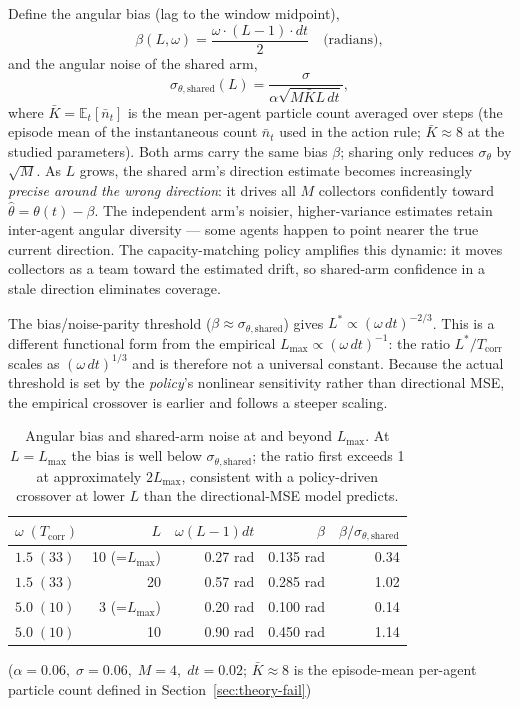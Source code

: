 \documentclass[sigconf,anonymous]{aamas}
\newcommand{\Lmax}{L_{\max}}
\newcommand{\Tcorr}{T_{\mathrm{corr}}}
\newcommand{\angbias}{\beta}
\begin{document}
Define the angular bias (lag to the window midpoint),
\[
  \angbias(L,\omega) = \frac{\omega \cdot (L-1) \cdot dt}{2}
    \quad \text{(radians)},
\]
and the angular noise of the shared arm,
\[
  \sigma_{\theta,\mathrm{shared}}(L) =
  \frac{\sigma}{\alpha\sqrt{M\bar{K} L\, dt}},
\]
where $\bar{K} = \mathbb{E}_t[\bar{n}_t]$ is the mean per-agent particle
count averaged over steps (the episode mean of the instantaneous
count $\bar{n}_t$ used in the action rule; $\bar{K}{\approx}8$ at
the studied parameters).
Both arms carry the same bias $\angbias$; sharing only reduces
$\sigma_\theta$ by $\sqrt{M}$.  As $L$ grows, the shared arm's
direction estimate becomes increasingly \emph{precise around the
wrong direction}: it drives all $M$ collectors confidently toward
$\hat{\theta} = \theta(t) - \angbias$.  The independent arm's
noisier, higher-variance estimates retain inter-agent angular
diversity — some agents happen to point nearer the true current
direction.  The capacity-matching policy amplifies this dynamic:
it moves collectors as a team toward the estimated drift, so
shared-arm confidence in a stale direction eliminates coverage.

The bias/noise-parity threshold ($\angbias \approx
\sigma_{\theta,\mathrm{shared}}$) gives $L^* \propto (\omega\,dt)^{-2/3}$.
This is a different functional form from the empirical
$\Lmax \propto (\omega\,dt)^{-1}$: the ratio $L^*/\Tcorr$
scales as $(\omega\,dt)^{1/3}$ and is therefore not a universal
constant.  Because the actual threshold is set by the
\emph{policy}'s nonlinear sensitivity rather than directional MSE,
the empirical crossover is earlier and follows a steeper scaling.

\begin{table}[t]
\centering
\caption{Angular bias and shared-arm noise at and beyond
$\Lmax$.  At $L{=}\Lmax$ the bias is well below
$\sigma_{\theta,\mathrm{shared}}$; the ratio first exceeds 1 at
approximately $2\Lmax$, consistent with a policy-driven crossover
at lower $L$ than the directional-MSE model predicts.}
\label{tab:bias-noise}
\setlength\tabcolsep{5pt}
\begin{tabular}{lrrrr}
\toprule
$\omega\;(\Tcorr)$ & $L$ & $\omega(L{-}1)dt$ & $\angbias$ & $\angbias/\sigma_{\theta,\mathrm{shared}}$\\
\midrule
$1.5\;(33)$ & 10 (=$\Lmax$) & 0.27 rad & 0.135 rad & 0.34 \\
$1.5\;(33)$ & 20            & 0.57 rad & 0.285 rad & 1.02 \\
$5.0\;(10)$ &  3 (=$\Lmax$) & 0.20 rad & 0.100 rad & 0.14 \\
$5.0\;(10)$ & 10            & 0.90 rad & 0.450 rad & 1.14 \\
\bottomrule
\end{tabular}
{\small ($\alpha{=}0.06,\;\sigma{=}0.06,\;M{=}4,\;dt{=}0.02$;
$\bar{K}{\approx}8$ is the episode-mean per-agent particle count
defined in Section~\ref{sec:theory-fail})}
\end{table}
\end{document}
